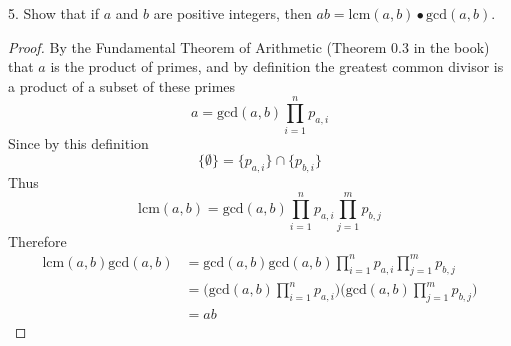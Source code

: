 5. Show that if $a$ and $b$ are positive integers, then $ab = \text{lcm}(a,b) \bullet \text{gcd}(a,b)$.

\begin{proof}
By the Fundamental Theorem of Arithmetic (Theorem 0.3 in the book) that $a$ is the product of primes, and by definition the greatest common divisor is a product of a subset of these primes
\[ a = \text{gcd}(a,b)\prod_{i=1}^{n} p_{a,i}\]
Since by this definition
\[\{\emptyset\} = \{p_{a,i}\} \cap \{p_{b,i}\}  \]
Thus 
\[\text{lcm}(a,b)= \text{gcd}(a,b)\prod_{i=1}^{n} p_{a,i} \prod_{j=1}^{m} p_{b,j}\]
Therefore
\begin{align}
\text{lcm}(a,b) \text{gcd}(a,b) &= \text{gcd}(a,b)\text{gcd}(a,b)\prod_{i=1}^{n} p_{a,i} \prod_{j=1}^{m} p_{b,j} \\
&= \big(\text{gcd}(a,b) \prod_{i=1}^{n} p_{a,i} \big)\big( \text{gcd}(a,b)\prod_{j=1}^{m} p_{b,j}\big) \\
&= ab
\end{align}
\end{proof}